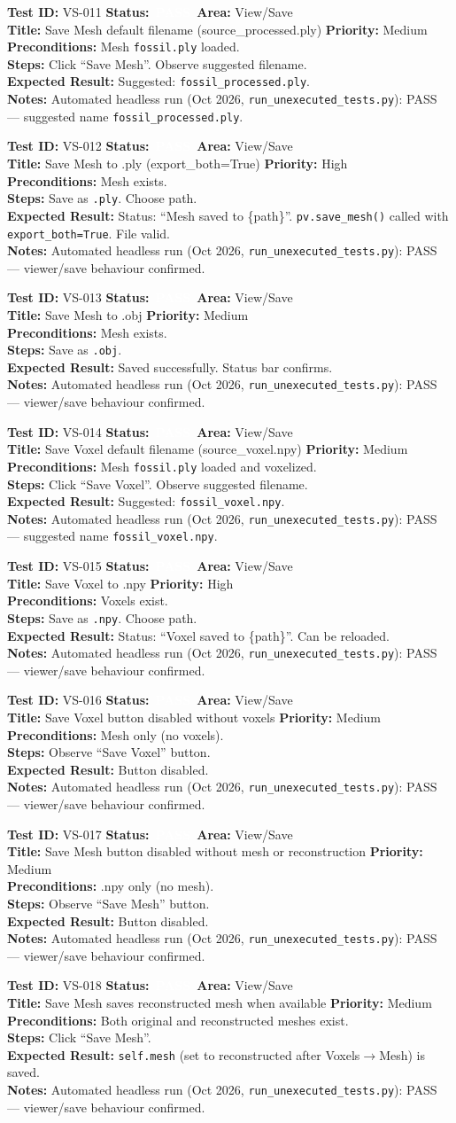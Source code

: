 \documentclass[12pt,a4paper]{article}
\newcommand{\statuspass}{\colorbox{statusgreen}{\textcolor{white}{\textbf{\,PASS\,}}}}
\newcommand{\testcase}[9]{%
  \smallskip
  \noindent\textbf{Test ID:} #1 \hfill \textbf{Status:} #2 \hfill \textbf{Area:} #3 \\
  \textbf{Title:} #4 \hfill \textbf{Priority:} #5 \\[0.3em]
  \textbf{Preconditions:} #6 \\[0.3em]
  \textbf{Steps:} #7 \\[0.3em]
  \textbf{Expected Result:} #8 \\
  \textbf{Notes:} #9
  \smallskip
}
\begin{document}
\testcase{VS-011}{\statuspass}{View/Save}{Save Mesh default filename (source\_processed.ply)}{Medium}{Mesh \texttt{fossil.ply} loaded.}{Click ``Save Mesh''. Observe suggested filename.}{Suggested: \texttt{fossil\_processed.ply}.}{Automated headless run (Oct 2026, \texttt{run\_unexecuted\_tests.py}): PASS --- suggested name \texttt{fossil\_processed.ply}.}


\testcase{VS-012}{\statuspass}{View/Save}{Save Mesh to .ply (export\_both=True)}{High}{Mesh exists.}{Save as \texttt{.ply}. Choose path.}{Status: ``Mesh saved to \{path\}''. \texttt{pv.save\_mesh()} called with \texttt{export\_both=True}. File valid.}{Automated headless run (Oct 2026, \texttt{run\_unexecuted\_tests.py}): PASS --- viewer/save behaviour confirmed.}


\testcase{VS-013}{\statuspass}{View/Save}{Save Mesh to .obj}{Medium}{Mesh exists.}{Save as \texttt{.obj}.}{Saved successfully. Status bar confirms.}{Automated headless run (Oct 2026, \texttt{run\_unexecuted\_tests.py}): PASS --- viewer/save behaviour confirmed.}


\testcase{VS-014}{\statuspass}{View/Save}{Save Voxel default filename (source\_voxel.npy)}{Medium}{Mesh \texttt{fossil.ply} loaded and voxelized.}{Click ``Save Voxel''. Observe suggested filename.}{Suggested: \texttt{fossil\_voxel.npy}.}{Automated headless run (Oct 2026, \texttt{run\_unexecuted\_tests.py}): PASS --- suggested name \texttt{fossil\_voxel.npy}.}


\testcase{VS-015}{\statuspass}{View/Save}{Save Voxel to .npy}{High}{Voxels exist.}{Save as \texttt{.npy}. Choose path.}{Status: ``Voxel saved to \{path\}''. Can be reloaded.}{Automated headless run (Oct 2026, \texttt{run\_unexecuted\_tests.py}): PASS --- viewer/save behaviour confirmed.}


\testcase{VS-016}{\statuspass}{View/Save}{Save Voxel button disabled without voxels}{Medium}{Mesh only (no voxels).}{Observe ``Save Voxel'' button.}{Button disabled.}{Automated headless run (Oct 2026, \texttt{run\_unexecuted\_tests.py}): PASS --- viewer/save behaviour confirmed.}


\testcase{VS-017}{\statuspass}{View/Save}{Save Mesh button disabled without mesh or reconstruction}{Medium}{.npy only (no mesh).}{Observe ``Save Mesh'' button.}{Button disabled.}{Automated headless run (Oct 2026, \texttt{run\_unexecuted\_tests.py}): PASS --- viewer/save behaviour confirmed.}


\testcase{VS-018}{\statuspass}{View/Save}{Save Mesh saves reconstructed mesh when available}{Medium}{Both original and reconstructed meshes exist.}{Click ``Save Mesh''.}{\texttt{self.mesh} (set to reconstructed after Voxels$\rightarrow$Mesh) is saved.}{Automated headless run (Oct 2026, \texttt{run\_unexecuted\_tests.py}): PASS --- viewer/save behaviour confirmed.}
\end{document}
